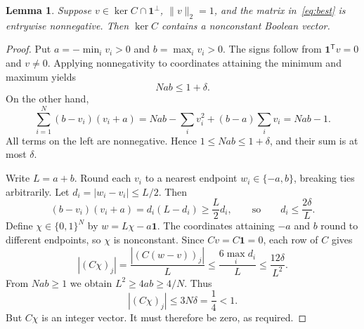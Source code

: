 \documentclass[11pt]{article}
\newtheorem{lemma}[theorem]{Lemma}
\newcommand{\one}{\mathbf 1}
\begin{document}
\begin{lemma}\label{lem:round}
Suppose $v\in\ker C\cap\one^\perp$, $\|v\|_2=1$, and the matrix in~\eqref{eq:best} is entrywise nonnegative. Then $\ker C$ contains a nonconstant Boolean vector.
\end{lemma}
\begin{proof}
Put $a=-\min_i v_i>0$ and $b=\max_i v_i>0$. The signs follow from $\one^{\mathsf T}v=0$ and $v\ne0$. Applying nonnegativity to coordinates attaining the minimum and maximum yields
\[
 Nab\leq1+\delta.
\]
On the other hand,
\begin{equation}\label{eq:variance}
 \sum_{i=1}^N(b-v_i)(v_i+a)
 =Nab-\sum_i v_i^2+(b-a)\sum_i v_i
 =Nab-1.
\end{equation}
All terms on the left are nonnegative. Hence $1\leq Nab\leq1+\delta$, and their sum is at most $\delta$.

Write $L=a+b$. Round each $v_i$ to a nearest endpoint $w_i\in\{-a,b\}$, breaking ties arbitrarily. Let $d_i=|w_i-v_i|\leq L/2$. Then
\[
 (b-v_i)(v_i+a)=d_i(L-d_i)\geq\frac L2d_i,
 \qquad\text{so}\qquad d_i\leq\frac{2\delta}{L}.
\]
Define $\chi\in\{0,1\}^N$ by $w=L\chi-a\one$. The coordinates attaining $-a$ and $b$ round to different endpoints, so $\chi$ is nonconstant. Since $Cv=C\one=0$, each row of $C$ gives
\[
 |(C\chi)_j|=\frac{|(C(w-v))_j|}{L}
 \leq\frac{6\max_i d_i}{L}
 \leq\frac{12\delta}{L^2}.
\]
From $Nab\geq1$ we obtain $L^2\geq4ab\geq4/N$. Thus
\[
 |(C\chi)_j|\leq3N\delta=\frac14<1.
\]
But $C\chi$ is an integer vector. It must therefore be zero, as required.
\end{proof}
\end{document}

